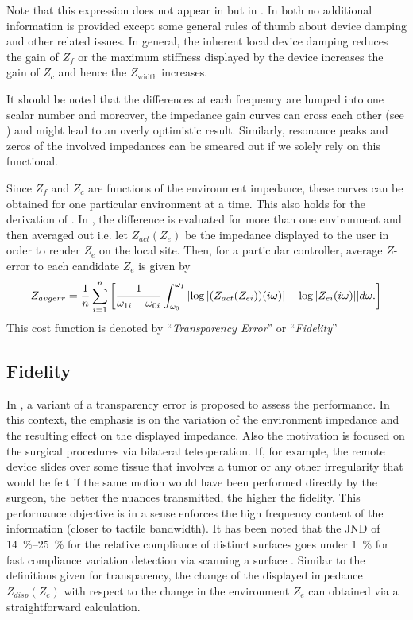 Note that this expression does not appear in \cite{colgate4} but in \cite{goranthesis,passenberg}. In both \cite{colgate4,
goranthesis} no additional information is provided except some general rules of thumb about device damping and other
related issues. In general, the inherent local device damping reduces the gain of $Z_f$ or the maximum stiffness displayed by the 
device increases the gain of $Z_c$ and hence the $Z_{\text{width}}$ increases.

It should be noted that the differences at each frequency are lumped into one scalar number and moreover, the impedance gain curves can
cross each other (see \cite{goranthesis}) and might lead to an overly optimistic result. Similarly, resonance peaks and zeros of the
involved impedances can be smeared out if we solely rely on this functional. 

Since $Z_f$ and $Z_c$ are functions of the environment impedance, these curves can be obtained for one particular environment
at a time. This also holds for the derivation of \cite{lawrence}. In \cite{goranthesis}, the difference  is evaluated for more 
than one environment and then averaged out i.e. let $Z_{act}(Z_e)$ be the impedance displayed to the user in order to render 
$Z_e$ on the local site. Then, for a particular controller, average $Z$-error to each candidate $Z_e$ is given by
\begin{equation}
Z_{avgerr} = \frac{1}{n}\sum_{i=1}^n{\left[
    \frac{1}{\omega_{1i}-\omega_{0i}}\int_{\omega_0}^{\omega_1}{%
                                     \abs{\log|(Z_{act}(Z_{ei}))(\iw)|-\log |Z_{ei}(\iw)|}}d\omega.
                                     \right]}
\label{eq:zdiff}
\end{equation}
This cost function is denoted by \enquote{\emph{Transparency Error}} or \enquote{\emph{Fidelity}}


\subsection{Fidelity}
In \cite{cavusoglu}, a variant of a transparency error is proposed to assess the performance. In this context, 
the emphasis is on the variation of the environment impedance and the resulting effect on the displayed impedance. 
Also the motivation is focused on the surgical procedures via bilateral teleoperation. If, for 
example, the remote device slides over some tissue that involves a tumor or any other irregularity that would be felt
if the same motion would have been performed directly by the surgeon, the better the nuances transmitted, the higher
the fidelity. This performance objective is in a sense enforces the high frequency content of the information (closer
to tactile bandwidth). It has been noted that the JND of \SIrange{14}{25}{\percent} for the relative compliance 
of distinct surfaces goes under \SI{1}{\percent} for fast compliance variation detection via scanning a surface
\cite{dhruvtendick}. Similar to the definitions given for transparency, the change of the displayed impedance 
$Z_{disp}(Z_e)$ with respect to the change in the environment $Z_e$ can obtained via a straightforward calculation.


